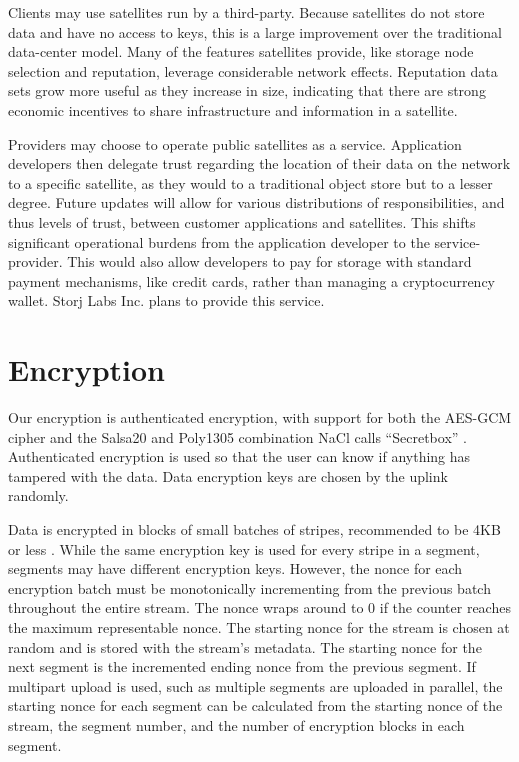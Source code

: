 \documentclass[11pt,fleqn,openany]{book}
\begin{document}
Clients may use satellites run by a third-party. Because satellites do not store
data and have no access to keys, this is a large improvement over the
traditional data-center model. Many of the features satellites provide, like
storage node selection and reputation, leverage considerable network effects.
Reputation data sets grow more useful as they increase in size,
indicating that there are strong economic incentives to share infrastructure
and information in a satellite.

Providers may choose to operate public satellites as a service.
Application developers then delegate trust regarding the location of their
data on the network to a specific satellite, as they
would to a traditional object store but to a lesser degree. Future updates
will allow for various distributions of responsibilities, and thus levels of
trust, between customer applications and satellites. This shifts significant
operational burdens from the application developer to the service-provider.
This would also allow developers to pay for storage with standard payment
mechanisms, like credit cards, rather than managing a cryptocurrency wallet.
Storj Labs Inc. plans to provide this service.

\section{Encryption}\label{sec:concrete-encryption}

Our encryption is authenticated encryption, with support for both the
AES-GCM cipher and the Salsa20 and Poly1305 combination NaCl calls ``Secretbox''
\cite{nacl-crypto}. Authenticated encryption is used so that the user can know
if anything has tampered with the data. Data encryption keys are chosen by the
uplink randomly.

Data is encrypted in blocks of small batches of stripes, recommended to be
4KB or less \cite{nacl-packetlen}. While the same encryption key is used for
every stripe in a segment, segments may have
different encryption keys. However, the nonce for each encryption
batch must be monotonically incrementing from the previous batch throughout the
entire stream. The nonce wraps around to 0 if the counter reaches the
maximum representable nonce. The starting nonce for the stream is chosen at
random and is stored with the stream's metadata.
The starting nonce for the next segment
is the incremented ending nonce from the previous segment. If multipart upload
is used, such as multiple segments are uploaded in parallel, the starting nonce
for each segment can be calculated from the starting nonce of the stream, the
segment number, and the number of encryption blocks in each segment.
\end{document}
